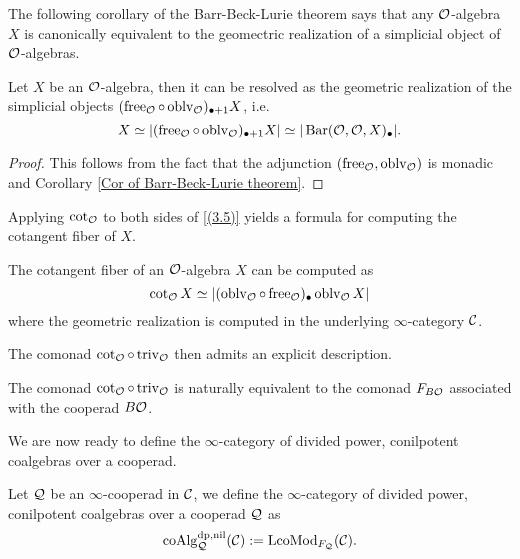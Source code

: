The following corollary of the Barr-Beck-Lurie theorem \cite[Theorem 4.7.3.5.]{HA} says that any ${\mathcal{O}}$-algebra $X$ is canonically equivalent to the geomectric realization of a simplicial object of ${\mathcal{O}}$-algebras.
\begin{proposition}
\label{free resolutino of O-algebras}
Let $X$ be an ${\mathcal{O}}$-algebra, then it can be resolved as the geometric realization of the simplicial objects $(\operatorname{free}_{{\mathcal{O}}}\circ \operatorname{oblv}_{{\mathcal{O}}})_{\bullet + 1}X$, i.e. 
\begin{equation}
\label{(3.5)}
    X \simeq
|(\operatorname{free}_{{\mathcal{O}}}\circ \operatorname{oblv}_{{\mathcal{O}}})_{\bullet + 1}X|
\simeq |\operatorname{Bar}({\mathcal{O}}, {\mathcal{O}}, X)_{\bullet}|.
\end{equation}
\end{proposition}
\begin{proof}
    This follows from the fact that the adjunction $(\operatorname{free}_{{\mathcal{O}}}, \operatorname{oblv}_{{\mathcal{O}}})$ is monadic and Corollary \ref{Cor of Barr-Beck-Lurie theorem}.
    
\end{proof}
Applying $\cot_{{\mathcal{O}}}$ to both sides of \eqref{(3.5)} yields a formula for computing the cotangent fiber of $X$. 
\begin{corollary}
\cite[Proposition 4.4]{Heuts_Koszul}
The cotangent fiber of an ${\mathcal{O}}$-algebra $X$ can be computed as 
$$
\cot_{{\mathcal{O}}}X \simeq 
|(\operatorname{oblv}_{{\mathcal{O}}}\circ \operatorname{free}_{{\mathcal{O}}})_{\bullet}\operatorname{oblv}_{{\mathcal{O}}}X|
$$
where the geometric realization is computed in the underlying $\infty$-category ${\mathcal{C}}$.
\end{corollary}

The comonad $\cot_{{\mathcal{O}}}\circ \operatorname{triv}_{{\mathcal{O}}}$ then admits an explicit description.
\begin{proposition}
\label{cot triv is F_BO}
\cite[Proposition 4.5]{Heuts_Koszul}
The comonad $\cot_{{\mathcal{O}}}\circ \operatorname{triv}_{{\mathcal{O}}}$ is naturally equivalent to the comonad $F_{B{\mathcal{O}}}$ associated with the cooperad $B{\mathcal{O}}$.
\end{proposition}

We are now ready to define the $\infty$-category of divided power, conilpotent coalgebras over a cooperad.
\begin{definition}
\label{coalgebras over a cooperad}
	Let ${\mathcal{Q}}$ be an $\infty$-cooperad in ${\mathcal{C}}$, we define the $\infty$-category of divided power, conilpotent coalgebras over a cooperad ${\mathcal{Q}}$ as 
	$$
	\operatorname{coAlg}^{\operatorname{dp}, \operatorname{nil}}_{{\mathcal{Q}}}({\mathcal{C}}):= \operatorname{LcoMod}_{F_{{\mathcal{Q}}}}({\mathcal{C}}).
	$$
\end{definition}

